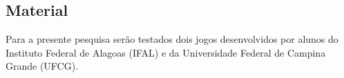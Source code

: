 \subsection{Material}
Para a presente pesquisa serão testados dois jogos desenvolvidos por alunos do Instituto Federal de Alagoas (IFAL) e da Universidade Federal de Campina Grande (UFCG).

%
%
%
%
